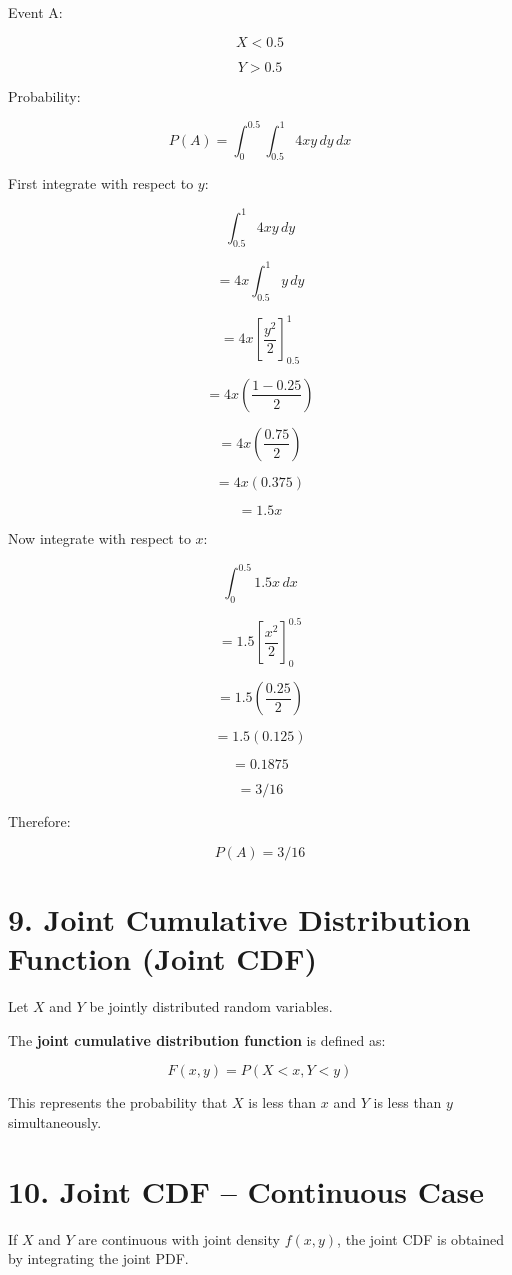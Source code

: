 \documentclass{article}
\begin{document}
Event A:

\[
X < 0.5
\]

\[
Y > 0.5
\]

Probability:

\[
P(A) = \int_{0}^{0.5} \int_{0.5}^{1} 4xy \, dy \, dx
\]

First integrate with respect to $y$:

\[
\int_{0.5}^{1} 4xy \, dy
\]

\[
= 4x \int_{0.5}^{1} y \, dy
\]

\[
= 4x \left[\frac{y^{2}}{2}\right]_{0.5}^{1}
\]

\[
= 4x \left(\frac{1 - 0.25}{2}\right)
\]

\[
= 4x \left(\frac{0.75}{2}\right)
\]

\[
= 4x (0.375)
\]

\[
= 1.5x
\]

Now integrate with respect to $x$:

\[
\int_{0}^{0.5} 1.5x \, dx
\]

\[
= 1.5 \left[\frac{x^{2}}{2}\right]_{0}^{0.5}
\]

\[
= 1.5 \left(\frac{0.25}{2}\right)
\]

\[
= 1.5 (0.125)
\]

\[
= 0.1875
\]

\[
= 3 / 16
\]

Therefore:

\[
P(A) = 3/16
\]

\bigskip

\section*{9. Joint Cumulative Distribution Function (Joint CDF)}

Let $X$ and $Y$ be jointly distributed random variables.

The \textbf{joint cumulative distribution function} is defined as:

\[
F(x, y) = P(X < x, Y < y)
\]

This represents the probability that $X$ is less than $x$ and $Y$ is less than $y$ simultaneously.

\bigskip

\section*{10. Joint CDF – Continuous Case}

If $X$ and $Y$ are continuous with joint density $f(x,y)$, the joint CDF is obtained by integrating the joint PDF.
\end{document}
